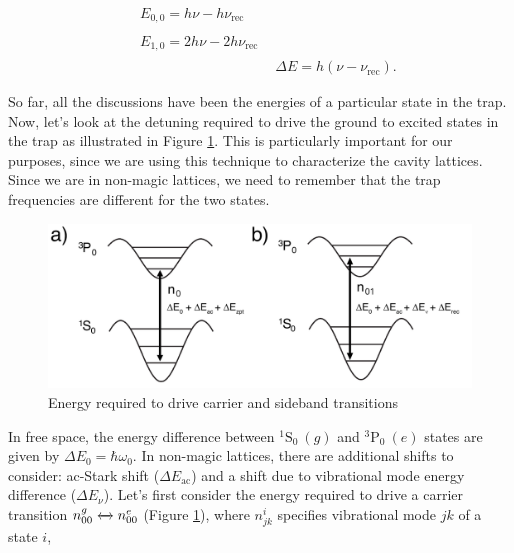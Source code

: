 \documentclass[bibnotes]{article}
\newcommand{\SLJ}[3]{{\ensuremath{{^{#1}}\mathrm{#2}_{#3}}}}
\newcommand{\TPZ}{\SLJ{3}{P}{0} \ }
\newcommand{\SSZ}{\SLJ{1}{S}{0} \ }
\begin{document}
	\begin{align}
	\begin{split}\label{eq:energy_deep_lattice_n0}
		& E_{0,0}=h\nu-h\nu_{\text{rec}}
	\end{split}\\
	\begin{split}\label{eq:energy_deep_lattice_n1}
		& E_{1,0}=2h\nu-2h\nu_{\text{rec}}
	\end{split}\\
	& \Delta E = h(\nu - \nu_{\text{rec}})\nonumber.
	\end{align}


	\noindent So far, all the discussions have been the energies of a particular state in the trap. Now, let's look at the detuning required to drive the ground to excited states in the trap as illustrated in Figure \ref{fig:potential_intro}. This is particularly important for our purposes, since we are using this technique to characterize the cavity lattices. Since we are in non-magic lattices, we need to remember that the trap frequencies are different for the two states.

	\begin{figure}
	    \centering
	    \includegraphics[scale=0.8]{figures/potential_intro.pdf}
	    \caption{Energy required to drive carrier and sideband transitions}
	    \label{fig:potential_intro}
	\end{figure}


	In free space, the energy difference between $\SSZ (g)$ and $\TPZ (e)$ states are given by $\Delta E_{0}=\hbar\omega_{0}$. In non-magic lattices, there are additional shifts to consider: ac-Stark shift ($\Delta E_{\text{ac}}$) and a shift due to vibrational mode energy difference ($\Delta E_\nu$). Let's first consider the energy required to drive a carrier transition $n^{g}_{00}\xleftrightarrow{}n^{e}_{00}$ (Figure \ref{fig:potential_intro}), where $n^{i}_{jk}$ specifies vibrational mode $jk$ of a state $i$, 
\end{document}
